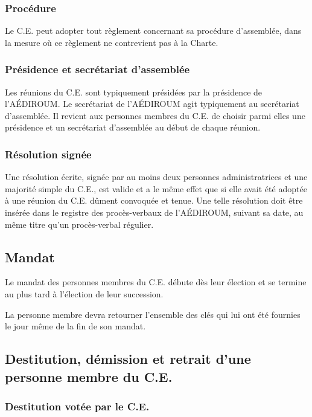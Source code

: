\documentclass{aediroum}
\begin{document}
\subsubsection{Procédure}\label{sec:procedure-admin}

Le C.E. peut adopter tout règlement concernant sa procédure d'assemblée, dans la mesure où ce règlement ne contrevient pas à la Charte.

\subsubsection{Présidence et secrétariat d'assemblée}\label{sec:president-et-secretaire-dassemblee}

Les réunions du C.E. sont typiquement présidées par la présidence de l'AÉDIROUM. Le secrétariat de l'AÉDIROUM agit typiquement au secrétariat d’assemblée. Il revient aux personnes membres du C.E. de choisir parmi elles une présidence et un secrétariat d'assemblée au début de chaque réunion.

\subsubsection{Résolution signée}\label{sec:resolution-signee}

Une résolution écrite, signée par au moins deux personnes administratrices et une majorité simple du C.E., est valide et a le même effet que si elle avait été adoptée à une réunion du C.E. dûment convoquée et tenue. Une telle résolution doit être insérée dans le registre des procès-verbaux de l'AÉDIROUM, suivant sa date, au même titre qu'un procès-verbal régulier.

\subsection{Mandat}\label{sec:mandat}
Le mandat des personnes membres du C.E. débute dès leur élection et se termine au plus tard à l'élection de leur succession.

La personne membre devra retourner l'ensemble des clés qui lui ont été fournies le jour même de la fin de son mandat.

\subsection{Destitution, démission et retrait d'une personne membre du C.E.}\label{sec:destitution-demission-retrait-exec-admin}
\subsubsection{Destitution votée par le C.E.}\label{sec:destitution}
\end{document}
